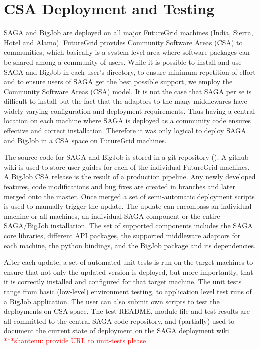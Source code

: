 \documentclass[]{paper}
\newcommand{\jhanote}[1]{ {\textcolor{red} { ***shantenu: #1 }}}
\newcommand{\jhanote}[1]{}
\begin{document}
\section{CSA Deployment and Testing}
SAGA and BigJob are deployed on all major FutureGrid machines (India,
Sierra, Hotel and Alamo).  FutureGrid provides Community Software
Areas (CSA) to communities, which basically is a system level area
where software packages can be shared among a community of users.
While it is possible to install and use SAGA and BigJob in each user's
directory, to ensure minimum repetition of effort and to ensure users
of SAGA get the best possible support, we employ the Community
Software Areas (CSA) model.  It is not the case that SAGA per se is
difficult to install but the fact that the adaptors to the many
middlewares have widely varying configuration and deployment
requirements.  Thus having a central location on each machine where
SAGA is deployed as a community code ensures effective and correct
installation.  Therefore it was only logical to deploy SAGA and BigJob
in a CSA space on FutureGrid machines.

The source code for SAGA and BigJob is stored in a git repository
(\cite{bigjob_web}). A github wiki is used to store user guides for
each of the individual FutureGrid machines. A BigJob CSA release is
the result of a production pipeline. Any newly developed features,
code modifications and bug fixes are created in branches and later
merged onto the master. Once merged a set of semi-automatic deployment
scripts is used to manually trigger the update. The update can
encompass an individual machine or all machines, an individual SAGA
component or the entire SAGA/BigJob installation. The set of supported
components includes the SAGA core libraries, different API packages,
the supported middleware adaptors for each machine, the python
bindings, and the BigJob package and its dependencies.

After each update, a set of automated unit tests is run on the target
machines to ensure that not only the updated version is deployed, but
more importantly, that it is correctly installed and configured for
that target machine. The unit tests range from basic (low-level)
environment testing, to application level test runs of a BigJob
application. The user can also submit own scripts to test the
deployments on CSA space. The test README, module file and test
results are all committed to the central SAGA code repository, and
(partially) used to document the current state of deployment on the
SAGA deployment wiki.  \jhanote{provide URL to unit-tests please}
\end{document}
